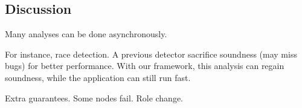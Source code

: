 
\subsection{Discussion} \label{sec:discuss}

Many analyses can be done asynchronously.

For instance, race detection. A previous detector sacrifice soundness (may miss 
bugs) for better performance. With our framework, this analysis can regain 
soundness, while the application can still run fast.

Extra guarantees. Some nodes fail. Role change.